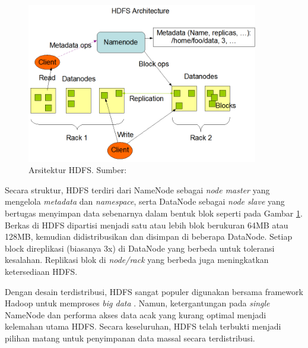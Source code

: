 \begin{figure}[h!]
    \centering
    \includegraphics[width=0.9\textwidth]{figures/ch02/hdfsarchitecture}
    \caption{Arsitektur HDFS. Sumber: \cite{ApacheHadoopHDFS}}
    \label{fig:hdfs-arch}
\end{figure}

Secara struktur, HDFS terdiri dari NameNode sebagai \textit{node master} yang mengelola \textit{metadata} dan \textit{namespace}, serta DataNode sebagai \textit{node slave} yang bertugas menyimpan data sebenarnya dalam bentuk blok seperti pada Gambar \ref{fig:hdfs-arch}. Berkas di HDFS dipartisi menjadi satu atau lebih blok berukuran 64MB atau 128MB, kemudian didistribusikan dan disimpan di beberapa DataNode. Setiap block direplikasi (biasanya 3x) di DataNode yang berbeda untuk toleransi kesalahan. Replikasi blok di \textit{node/rack} yang berbeda juga meningkatkan ketersediaan HDFS.

Dengan desain terdistribusi, HDFS sangat populer digunakan bersama framework Hadoop untuk memproses \textit{big data} \cite{almansouriHadoopDistributedFile2019}. Namun, ketergantungan pada \textit{single} NameNode dan performa akses data acak yang kurang optimal menjadi kelemahan utama HDFS. Secara keseluruhan, HDFS telah terbukti menjadi pilihan matang untuk penyimpanan data massal secara terdistribusi.

